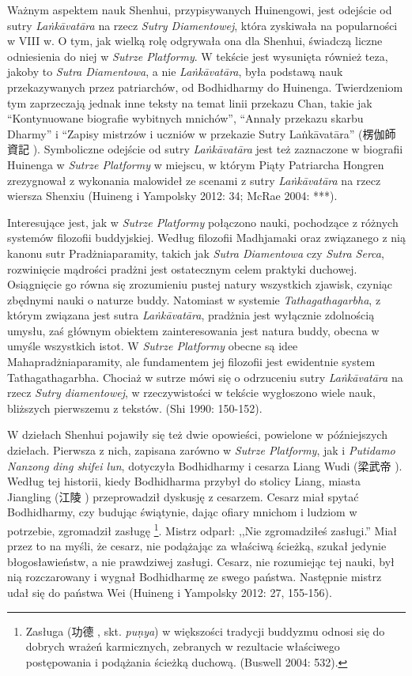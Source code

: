 Ważnym aspektem nauk Shenhui, przypisywanych Huinengowi, jest odejście od sutry \textit{La\.nkā\-vatāra} na rzecz \textit{Sutry Diamentowej}, która zyskiwała na popularności w VIII w.
O tym, jak wielką rolę odgrywała ona dla Shenhui, świadczą liczne odniesienia do niej w \textit{Sutrze Platformy}.
W tekście jest wysunięta również teza, jakoby to \textit{Sutra Diamentowa}, a nie \textit{La\.nkāvatāra}, była podstawą nauk przekazywanych przez patriarchów, od Bodhidharmy do Huinenga.
Twierdzeniom tym zaprzeczają jednak inne teksty na temat linii przekazu Chan, takie jak ``Kontynuowane biografie wybitnych mnichów'', ``Annały przekazu skarbu Dharmy'' i ``Zapisy mistrzów i uczniów w przekazie Sutry La\.nkāvatāra'' (楞伽師資記 ).
Symboliczne odejście od sutry \textit{La\.nkāvatāra} jest też zaznaczone w biografii Huinenga w \textit{Sutrze Platformy} w miejscu, w którym Piąty Patriarcha Hongren zrezygnował z wykonania malowideł ze scenami z sutry \textit{La\.nkāvatāra} na rzecz wiersza Shenxiu (Huineng i Yampolsky 2012: 34; McRae 2004: ***).

Interesujące jest, jak w \textit{Sutrze Platformy} połączono nauki, pochodzące z różnych systemów filozofii buddyjskiej.
Według filozofii Madhjamaki oraz związanego z nią kanonu sutr Pradżniaparamity, takich jak \textit{Sutra Diamentowa} czy \textit{Sutra Serca}, rozwinięcie mądrości pradżni jest ostatecznym celem praktyki duchowej.
Osiągnięcie go równa się zrozumieniu pustej natury wszystkich zjawisk, czyniąc zbędnymi nauki o naturze buddy.
Natomiast w systemie \textit{Tathagathagarbha}, z którym związana jest sutra \textit{La\.nkā\-vatāra}, pradżnia jest wyłącznie zdolnością umysłu, zaś głównym obiektem zainteresowania jest natura buddy, obecna w umyśle wszystkich istot.
W \textit{Sutrze Platformy} obecne są idee Mahapradżniaparamity, ale fundamentem jej filozofii jest ewidentnie system Tathagathagarbha.
Chociaż w sutrze mówi się o odrzuceniu sutry \textit{La\.nkā\-vatāra} na rzecz \textit{Sutry diamentowej}, w rzeczywistości w tekście wygłoszono wiele nauk, bliższych pierwszemu z tekstów.
(Shi 1990: 150-152).

W dziełach Shenhui pojawiły się też dwie opowieści, powielone w późniejszych dziełach. Pierwsza z nich, zapisana zarówno w \textit{Sutrze Platformy}, jak i \textit{Putidamo Nanzong ding shifei lun}, dotyczyła Bodhidharmy i cesarza Liang Wudi (梁武帝 ).
Według tej historii, kiedy Bodhidharma przybył do stolicy Liang, miasta Jiangling (江陵 ) przeprowadził dyskusję z cesarzem. Cesarz miał spytać Bodhidharmy, czy budując świątynie, dając ofiary mnichom i ludziom w potrzebie, zgromadził zasługę%
\footnote{Zasługa (功德 , skt. \textit{pu\d{n}ya}) w większości tradycji buddyzmu odnosi się do dobrych wrażeń karmicznych, zebranych w rezultacie właściwego postępowania i podążania ścieżką duchową. (Buswell 2004: 532).}.
Mistrz odparł: ,,Nie zgromadziłeś zasługi.'' Miał przez to na myśli, że cesarz, nie podążając za właściwą ścieżką, szukał jedynie błogosławieństw, a nie prawdziwej zasługi. Cesarz, nie rozumiejąc tej nauki, był nią rozczarowany i wygnał Bodhidharmę ze swego państwa. Następnie mistrz udał się do państwa Wei\label{LiangWuDi} (Huineng i Yampolsky 2012: 27, 155-156).

